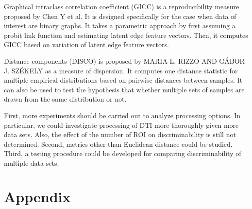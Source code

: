 \documentclass{article}
\begin{document}
Graphical intraclass correlation coefficient (GICC) is a reproducibility measure proposed by Chen Y et al. It is designed specifically for the case when data of interest are binary graphs. It takes a parametric approach by first assuming a probit link function and estimating latent edge feature vectors. Then, it computes GICC based on variation of latent edge feature vectors.

Distance components (DISCO) is proposed by MARIA L. RIZZO AND GÁBOR J. SZÉKELY as a measure of dispersion. It computes one distance statistic for multiple empirical distributions based on pairwise distances between samples. It can also be used to test the hypothesis that whether multiple sets of samples are drawn from the same distribution or not. 


 First, more experiments should be carried out to analyze processing options. In particular, we could investigate processing of DTI more thoroughly given more data sets. Also, the effect of the number of ROI on discriminability is still not determined. Second, metrics other than Euclidean distance could be studied. Third, a testing procedure could be developed for comparing discriminability of multiple data sets.



\section{Appendix}


% 
% 
% 
% 
% 
% 
% 
% 
\end{document}

